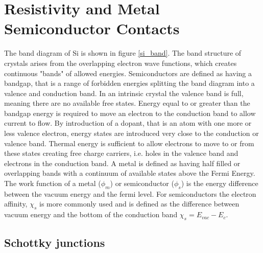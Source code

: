 \section{Resistivity and Metal Semiconductor Contacts}
The band diagram of Si is shown in figure \ref{si_band}. The band structure of crystals arises from the overlapping electron wave functions, which creates continuous "bands" of allowed energies. Semiconductors are defined as having a bandgap, that is a range of forbidden energies splitting the band diagram into a valence and conduction band. In an intrinsic crystal the valence band is full, meaning there are no available free states. Energy equal to or greater than the bandgap energy is required to move an electron to the conduction band to allow current to flow. By introduction of a dopant, that is an atom with one more or less valence electron, energy states are introduced very close to the conduction or valence band. Thermal energy is sufficient to allow electrons to move to or from these states creating free charge carriers, i.e. holes in the valence band and electrons in the conduction band. A metal is defined as having half filled or overlapping bands with a continuum of available states above the Fermi Energy. The work function of a metal ($\phi_m$) or semiconductor ($\phi_s$) is the energy difference between the vacuum energy and the fermi level. For semiconductors the electron affinity, $\chi_s$ is more commonly used and is defined as the difference between vacuum energy and the bottom of the conduction band $\chi_s = E_{vac}-E_c$.

\subsection{Schottky junctions}

